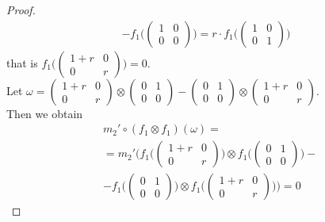 \documentclass[a4paper, 12pt, openany, fleqn]{amsart}
\begin{document}
\begin{proof}
    \begin{align*}
        -f_1\Biggl(\begin{pmatrix}
        1 & 0\\
        0 & 0
    \end{pmatrix}\Biggl) = r\cdot f_1\Biggl(\begin{pmatrix}
        1 & 0\\
        0 & 1
    \end{pmatrix}\Biggl)
    \end{align*}
    that is $f_1\Biggl(\begin{pmatrix}
        1+r & 0\\
        0 & r
    \end{pmatrix}\Biggl)=0$.\\ Let $\omega = \begin{pmatrix}
        1+r & 0\\
        0 & r
    \end{pmatrix}\otimes\begin{pmatrix}
        0 & 1\\
        0 & 0
    \end{pmatrix} - \begin{pmatrix}
        0 & 1\\
        0 & 0
    \end{pmatrix}\otimes\begin{pmatrix}
        1+r & 0\\
        0 & r
    \end{pmatrix}$.\\ Then we obtain
    \begin{align*}
        &m_2'\circ (f_1\otimes f_1)(\omega)=\\ &= m_2'\Biggl(f_1\Biggl(\begin{pmatrix}
        1+r & 0\\
        0 & r
    \end{pmatrix}\Biggl)\otimes f_1\Biggl(\begin{pmatrix}
        0 & 1\\
        0 & 0
    \end{pmatrix}\Biggl) -\\& -f_1\Biggl(\begin{pmatrix}
        0 & 1\\
        0 & 0
    \end{pmatrix}\Biggl)\otimes f_1\Biggl(\begin{pmatrix}
        1+r & 0\\
        0 & r
    \end{pmatrix}\Biggl)\Biggl) = 0

\end{align*}
\end{proof}
\end{document}

